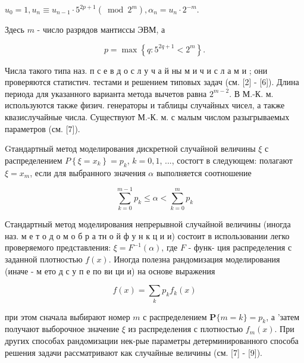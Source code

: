 \documentclass[10pt]{article}
\begin{document}
$u_{0}=1, u_{n} \equiv u_{n-1} \cdot 5^{2 p+1}\left(\bmod 2^{m}\right), \alpha_{n}=u_{n} \cdot 2^{-m}$.



Здесь $m$ - число разрядов мантиссы ЭВМ, а



\[

p=\max \left\{q: 5^{2 q+1}<2^{m}\right\} .

\]



Числа такого типа наз. п с е в д о с л у ч а й ны м и ч и с л а м и ; они проверяются статистич. тестами и решением типовых задач (см. [2] - [6]). Длина периода для указанного варианта метода вычетов равна $2^{m-2}$. В М.-К. м. используются также физич. генераторы и таблицы случайных чисел, а также квазислучайные числа. Существуют М.-К. м. с малым числом разыгрываемых параметров (см. [7]).



Gтандартный метод моделирования дискретной случайной величины $\xi$ с распределением $P\left\{\xi=x_{k}\right\}=p_{k}$, $k=0,1$, ..., состогт в следующем: полагают $\xi=x_{m}$, если для выбранного значения $\alpha$ выполняется соотношение



\[

\sum_{k=0}^{m-1} p_{k} \leqslant \alpha<\sum_{k=0}^{m} p_{k}

\]



Стандартный метод моделирования непрерывной случайной величины (иногда наз. м е т о д о м о б р а тн о й ф у н к ц и и) состоит в использовании легко проверяемого представления: $\xi=F^{-1}(\alpha)$, где $F$ - функ- ция распределения с заданной плотностью $f(x)$. Иногда полезна рандомизация моделирования (иначе - м ето д с у п е по ви ци и) на основе выражения



\[

f(x)=\sum_{k} p_{k} f_{k}(x)

\]



при этом сначала выбирают номер $m$ с распределением $\boldsymbol{P}\{m=k\}=p_{k}$, а 'затем получают выборочное значение $\xi$ из распределения с плотностью $f_{m}(x)$. При других способах рандомизации нек-рые параметры детерминированного способа решения задачи рассматривают как случайные величины (см. [7] - [9]).
\end{document}
